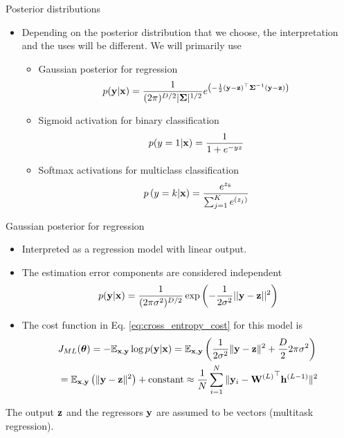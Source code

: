 \documentclass{beamer}
\begin{document}
\begin{frame}{Posterior distributions}
\begin{itemize}
\item Depending on the posterior distribution that we choose, the interpretation and the uses will be different. We will primarily use
\begin{itemize}
    \item Gaussian posterior for regression
    \begin{equation}
p({\bf y}|{\bf x})=\frac{1}{(2\pi)^{D/2}|{\boldsymbol \Sigma}|^{1/2}} e^{\left(-\frac{1}{2}\left({\bf y}- {\bf z}\right)^{\top}{\boldsymbol \Sigma}^{-1}\left({\bf y}- {\bf z}\right)\right)}
\end{equation}
    \item Sigmoid activation for binary classification
    \begin{equation}
    p(y=1|{\bf x})=\frac{1}{1+e^{-yz}} 
\end{equation}
    \item Softmax activations for multiclass classification
    \begin{equation}\nonumber
 p\left(y=k|{\bf x}\right)=\frac{e^{z_k}}{\sum_{j=1}^K e^{(z_{j})}}
\end{equation}
\end{itemize}
\end{itemize}
\end{frame}

\begin{frame}{Gaussian posterior for regression}
\begin{itemize}
\item Interpreted as a regression model with linear  output.  
\item The estimation error components are considered independent 
\begin{equation}
p({\bf y}|{\bf x})=\frac{1}{(2\pi \sigma^2)^{D/2}} \exp\left(-\frac{1}{2\sigma^2}||{\bf y}- {\bf z}||^2\right)
\end{equation}
    
    
\item The cost function in Eq. \eqref{eq:cross_entropy_cost} for this model is
\begin{equation}\nonumber
\begin{split}
&J_{ML}({\boldsymbol \theta})=-\mathbb{E}_{{\bf x},{\bf y}} \log p({\bf y}|{\bf x})%
=\mathbb{E}_{{\bf x},{\bf y}} \left(\frac{1}{2\sigma^2}\|{\bf y}- \bz\|^2+ \frac{D}{2} 2 \pi \sigma^2 \right)\\
& = \mathbb{E}_{{\bf x},{\bf y}} \left(\|{\bf y}- \bz\|^2 \right) +\text{constant}
\approx\frac{1}{N}\sum_{i=1}^N \|{\bf y}_i- {\bW^{(L)}}^\top{\bf h}^{(L-1)}\|^2 
\end{split}
\end{equation}
\end{itemize}
The output ${\bf z}$ and the regressors ${\bf y}$ are assumed to be vectors (multitask regression).
\end{frame}
\end{document}
